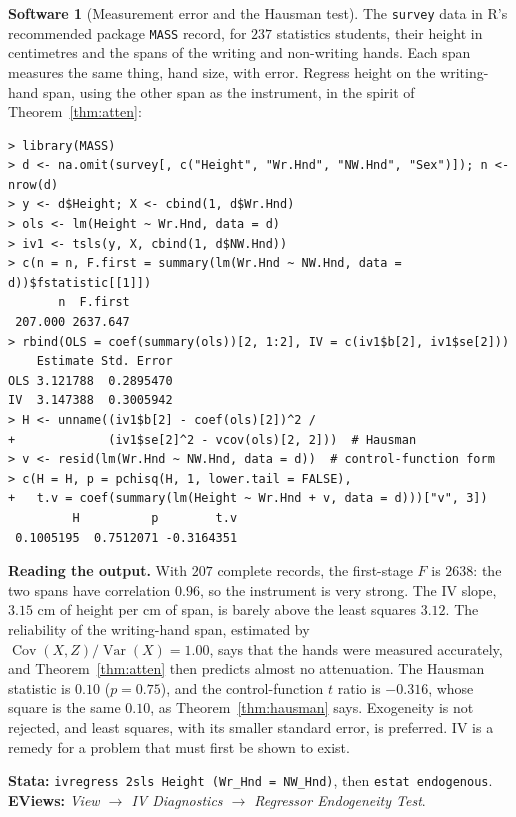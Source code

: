 \documentclass[11pt,a4paper]{article}
\numberwithin{equation}{section}
\DeclareMathOperator{\Var}{Var}
\DeclareMathOperator{\Cov}{Cov}
\theoremstyle{definition}
\newtheorem{software}[thm]{Software}
\begin{document}
\begin{software}[Measurement error and the Hausman test]
\label{sw:survey}
The \texttt{survey} data in R's recommended package \texttt{MASS} record, for $237$ statistics students, their height in centimetres and the spans of the writing
and non-writing hands. Each span measures the same thing, hand size, with error. Regress height on the writing-hand span, using the other span as
the instrument, in the spirit of Theorem~\ref{thm:atten}:
{\small\begin{verbatim}
> library(MASS)
> d <- na.omit(survey[, c("Height", "Wr.Hnd", "NW.Hnd", "Sex")]); n <- nrow(d)
> y <- d$Height; X <- cbind(1, d$Wr.Hnd)
> ols <- lm(Height ~ Wr.Hnd, data = d)
> iv1 <- tsls(y, X, cbind(1, d$NW.Hnd))
> c(n = n, F.first = summary(lm(Wr.Hnd ~ NW.Hnd, data = d))$fstatistic[[1]])
       n  F.first 
 207.000 2637.647 
> rbind(OLS = coef(summary(ols))[2, 1:2], IV = c(iv1$b[2], iv1$se[2]))
    Estimate Std. Error
OLS 3.121788  0.2895470
IV  3.147388  0.3005942
> H <- unname((iv1$b[2] - coef(ols)[2])^2 /
+             (iv1$se[2]^2 - vcov(ols)[2, 2]))  # Hausman
> v <- resid(lm(Wr.Hnd ~ NW.Hnd, data = d))  # control-function form
> c(H = H, p = pchisq(H, 1, lower.tail = FALSE),
+   t.v = coef(summary(lm(Height ~ Wr.Hnd + v, data = d)))["v", 3])
         H          p        t.v 
 0.1005195  0.7512071 -0.3164351 
\end{verbatim}}
\textbf{Reading the output.} With $207$ complete records, the first-stage $F$ is $2638$: the two spans have correlation $0.96$, so the instrument is very strong. The
IV slope, $3.15$ cm of height per cm of span, is barely above the least squares $3.12$. The reliability of the writing-hand span, estimated by
$\Cov(X, Z)/\Var(X) = 1.00$, says that the hands were measured accurately, and Theorem~\ref{thm:atten} then predicts almost no attenuation. The Hausman statistic is
$0.10$ ($p = 0.75$), and the control-function $t$ ratio is $-0.316$, whose square is the same $0.10$, as Theorem~\ref{thm:hausman} says. Exogeneity is not rejected, and least
squares, with its smaller standard error, is preferred. IV is a remedy for a problem that must first be shown to exist.

\textbf{Stata:} \texttt{ivregress 2sls Height (Wr\_Hnd = NW\_Hnd)}, then \texttt{estat endogenous}. \textbf{EViews:} \emph{View $\to$ IV Diagnostics $\to$ Regressor
Endogeneity Test}.
\end{software}
\end{document}
